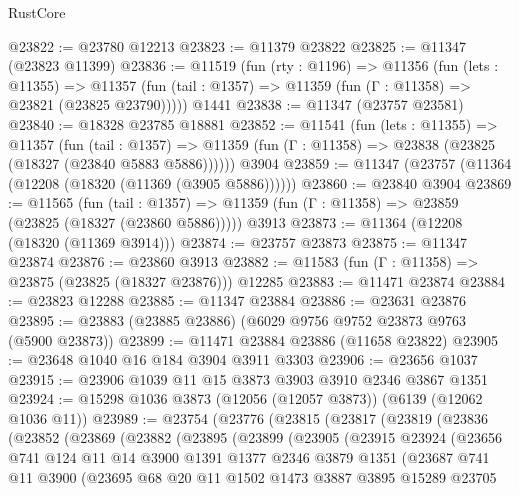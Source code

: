 \begin{lexlean}{RustCore}
\begin{coremodule}
@23822 := @23780 @12213
@23823 := @11379 @23822
@23825 := @11347 (@23823 @11399)
@23836 := @11519
    (fun (rty : @1196) =>
    @11356
      (fun (lets : @11355) =>
      @11357 (fun (tail : @1357) => @11359 (fun (Γ : @11358) => @23821 (@23825 @23790)))))
    @1441
@23838 := @11347 (@23757 @23581)
@23840 := @18328 @23785 @18881
@23852 := @11541
    (fun (lets : @11355) =>
    @11357
      (fun (tail : @1357) =>
      @11359 (fun (Γ : @11358) => @23838 (@23825 (@18327 (@23840 @5883 @5886))))))
    @3904
@23859 := @11347 (@23757 (@11364 (@12208 (@18320 (@11369 (@3905 @5886))))))
@23860 := @23840 @3904
@23869 := @11565
    (fun (tail : @1357) => @11359 (fun (Γ : @11358) => @23859 (@23825 (@18327 (@23860 @5886)))))
    @3913
@23873 := @11364 (@12208 (@18320 (@11369 @3914)))
@23874 := @23757 @23873
@23875 := @11347 @23874
@23876 := @23860 @3913
@23882 := @11583 (fun (Γ : @11358) => @23875 (@23825 (@18327 @23876))) @12285
@23883 := @11471 @23874
@23884 := @23823 @12288
@23885 := @11347 @23884
@23886 := @23631 @23876
@23895 := @23883 (@23885 @23886) (@6029 @9756 @9752 @23873 @9763 (@5900 @23873))
@23899 := @11471 @23884 @23886 (@11658 @23822)
@23905 := @23648 @1040 @16 @184 @3904 @3911 @3303
@23906 := @23656 @1037
@23915 := @23906 @1039 @11 @15 @3873 @3903 @3910 @2346 @3867 @1351
@23924 := @15298 @1036 @3873 (@12056 (@12057 @3873)) (@6139 (@12062 @1036 @11))
@23989 := @23754
    (@23776
      (@23815
        (@23817
          (@23819
            (@23836
              (@23852
                (@23869
                  (@23882
                    (@23895
                      (@23899
                        (@23905
                          (@23915
                            @23924
                            (@23656
                              @741
                              @124
                              @11
                              @14
                              @3900
                              @1391
                              @1377
                              @2346
                              @3879
                              @1351
                              (@23687
                                @741
                                @11
                                @3900
                                (@23695
                                  @68
                                  @20
                                  @11
                                  @1502
                                  @1473
                                  @3887
                                  @3895
                                  @15289
                                  @23705

\end{coremodule}
\end{lexlean}
